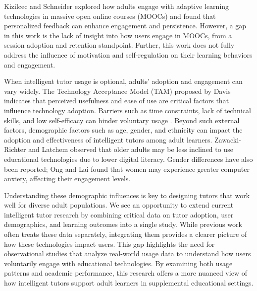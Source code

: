 Kizilcec and Schneider \cite{kizilcec2015motivation} explored how adults engage with adaptive learning technologies in massive open online courses (MOOCs) and found that personalized feedback can enhance engagement and persistence. However, a gap in this work is the lack of  insight into how users engage in MOOCs, from a session adoption and retention standpoint. Further, this work does not fully address the influence of motivation and self-regulation on their learning behaviors and engagement. 


When intelligent tutor usage is optional, adults' adoption and engagement can vary widely. The Technology Acceptance Model (TAM) proposed by Davis \cite{davis1989perceived} indicates that perceived usefulness and ease of use are critical factors that influence technology adoption. Barriers such as time constraints, lack of technical skills, and low self-efficacy can hinder voluntary usage \cite{sun2006role,cercone2008characteristics}. Beyond such external factors, demographic factors such as age, gender, and ethnicity can impact the adoption and effectiveness of intelligent tutors among adult learners. Zawacki-Richter and Latchem \cite{zawacki2014educational} observed that older adults may be less inclined to use educational technologies due to lower digital literacy. Gender differences have also been reported; Ong and Lai \cite{ong2006gender} found that women may experience greater computer anxiety, affecting their engagement levels. 

Understanding these demographic influences is key to designing tutors that work well for diverse adult populations. We see an opportunity to extend current intelligent tutor research by combining critical data on tutor adoption, user demographics, and learning outcomes into a single study. While previous work often treats these data separately, integrating them provides a clearer picture of how these technologies impact users. This gap highlights the need for observational studies that analyze real-world usage data to understand how users voluntarily engage with educational technologies. By examining both usage patterns and academic performance, this research offers a more nuanced view of how intelligent tutors support adult learners in supplemental educational settings.

